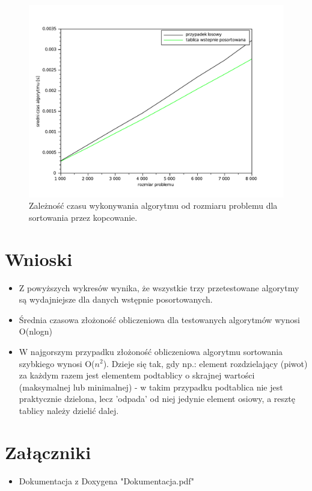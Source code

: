 \documentclass{mwart}
\begin{document}
\begin{figure}[!htp]
\centering
\includegraphics[width=\textwidth]{files/heap.pdf}
\caption{Zależność czasu wykonywania algorytmu od rozmiaru problemu dla sortowania przez kopcowanie. \label{heap}} 
\end{figure}




\section{Wnioski\label{wnioski}}
\begin{itemize}
\item Z powyższych wykresów wynika, że wszystkie trzy przetestowane algorytmy są wydajniejsze dla danych wstępnie posortowanych.
\item Średnia czasowa złożoność obliczeniowa dla testowanych algorytmów wynosi O(nlogn)
\item W najgorszym przypadku złożoność obliczeniowa algorytmu sortowania szybkiego wynosi O($n^{2}$). Dzieje się tak, gdy np.: element rozdzielający (piwot) za każdym razem jest elementem podtablicy o skrajnej wartości (maksymalnej lub minimalnej) - w takim przypadku podtablica nie jest praktycznie dzielona, lecz 'odpada' od niej jedynie element osiowy, a resztę tablicy należy dzielić dalej.
\end{itemize}

\section{Załączniki}
\begin{itemize}
\item Dokumentacja z Doxygena "Dokumentacja.pdf"
\end{itemize}
\end{document}
